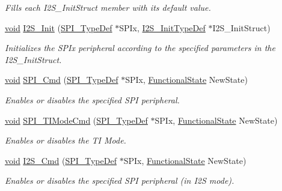 \begin{DoxyCompactItemize}
\begin{DoxyCompactList}\small\item\em Fills each I2\-S\-\_\-\-Init\-Struct member with its default value. \end{DoxyCompactList}\item 
\hyperlink{group___n_a_m_e_ga18028b8badbf1ea7e704ccac3c488e82}{void} \hyperlink{group___s_p_i___group1_ga53661884ae4a9640df7cbc59187782f7}{I2\-S\-\_\-\-Init} (\hyperlink{struct_s_p_i___type_def}{S\-P\-I\-\_\-\-Type\-Def} $\ast$S\-P\-Ix, \hyperlink{struct_i2_s___init_type_def}{I2\-S\-\_\-\-Init\-Type\-Def} $\ast$I2\-S\-\_\-\-Init\-Struct)
\begin{DoxyCompactList}\small\item\em Initializes the S\-P\-Ix peripheral according to the specified parameters in the I2\-S\-\_\-\-Init\-Struct. \end{DoxyCompactList}\item 
\hyperlink{group___n_a_m_e_ga18028b8badbf1ea7e704ccac3c488e82}{void} \hyperlink{group___s_p_i___group1_gaa31357879a65ee1ed7223f3b9114dcf3}{S\-P\-I\-\_\-\-Cmd} (\hyperlink{struct_s_p_i___type_def}{S\-P\-I\-\_\-\-Type\-Def} $\ast$S\-P\-Ix, \hyperlink{group___exported__types_gac9a7e9a35d2513ec15c3b537aaa4fba1}{Functional\-State} New\-State)
\begin{DoxyCompactList}\small\item\em Enables or disables the specified S\-P\-I peripheral. \end{DoxyCompactList}\item 
\hyperlink{group___n_a_m_e_ga18028b8badbf1ea7e704ccac3c488e82}{void} \hyperlink{group___s_p_i___group1_ga74594bf32e3bf4905ac7a2deef8eb475}{S\-P\-I\-\_\-\-T\-I\-Mode\-Cmd} (\hyperlink{struct_s_p_i___type_def}{S\-P\-I\-\_\-\-Type\-Def} $\ast$S\-P\-Ix, \hyperlink{group___exported__types_gac9a7e9a35d2513ec15c3b537aaa4fba1}{Functional\-State} New\-State)
\begin{DoxyCompactList}\small\item\em Enables or disables the T\-I Mode. \end{DoxyCompactList}\item 
\hyperlink{group___n_a_m_e_ga18028b8badbf1ea7e704ccac3c488e82}{void} \hyperlink{group___s_p_i___group1_gafe061c71bbc5b4224f3f2884dc53739e}{I2\-S\-\_\-\-Cmd} (\hyperlink{struct_s_p_i___type_def}{S\-P\-I\-\_\-\-Type\-Def} $\ast$S\-P\-Ix, \hyperlink{group___exported__types_gac9a7e9a35d2513ec15c3b537aaa4fba1}{Functional\-State} New\-State)
\begin{DoxyCompactList}\small\item\em Enables or disables the specified S\-P\-I peripheral (in I2\-S mode). \end{DoxyCompactList}\item 

\end{DoxyCompactItemize}
